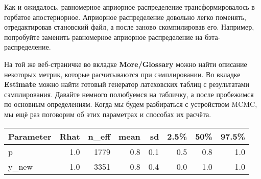  Как и ожидалось, равномерное априорное распределение трансформировалось в горбатое апостериорное.  Априорное распределение довольно легко поменять, отредактировав становский файл, а после заново скомпилировав его. Например, попробуйте заменить равномерное априорное распределение на бэта-распределение. 
 
 На той же веб-страничке во вкладке \textbf{More/Glossary} можно найти описание некоторых метрик, которые расчитываются при сэмплировании. Во вкладке \textbf{Estimate} можно найти готовый генератор латеховских таблиц с результатами сэмплирования. Давайте немного полюбуемся на табличку, а после пробежимся по основным определениям.  Когда мы будем разбираться с устройством MCMC, мы ещё раз поговорим об этих параметрах и способах их расчёта.  
  
\begin{center}
\begin{tabular}{lrrrrrrr}
	\toprule
	Parameter & Rhat & n\_eff & mean & sd & 2.5\% & 50\% & 97.5\% \\ 
	\midrule
	p & 1.0 & 1779 & 0.8 & 0.1 & 0.5 & 0.8 & 1.0 \\ 
	y\_new & 1.0 & 3351 & 0.8 & 0.4 & 0.0 & 1.0 & 1.0 \\ 
	\bottomrule
\end{tabular}
\end{center} 

